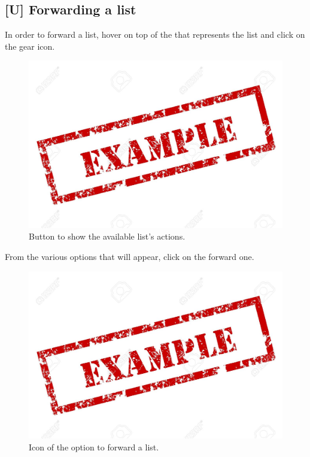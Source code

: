 \subsection{[U] Forwarding a list}
In order to forward a list, hover on top of the  that represents the list and click on the gear icon.

\begin{figure}[H]
  \centering 
  \includegraphics[width=\textwidth]{Sections/3-HowToUse/Images/example.jpeg}
  \caption{Button to show the available list's actions.}
\end{figure}

From the various options that will appear, click on the forward one.

\begin{figure}[H]
  \centering 
  \includegraphics[width=\textwidth]{Sections/3-HowToUse/Images/example.jpeg}
  \caption{Icon of the option to forward a list.}
\end{figure}

